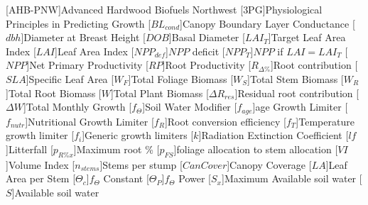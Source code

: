 \usepackage[printonlyused]{acronym}
[AHB-PNW]{Advanced Hardwood Biofuels Northwest}
[\textsc{3PG}]{Physiological Principles in Predicting Growth}
[\ensuremath{BL_{cond}}]{Canopy Boundary Layer Conductance}
[\ensuremath{dbh}]{Diameter at Breast Height}
[\ensuremath{DOB}]{Basal Diameter}
[\ensuremath{LAI_{T}}]{Target Leaf Area Index}
[\ensuremath{LAI}]{Leaf Area Index}
[\ensuremath{NPP_{def}}]{$NPP$ deficit}
[\ensuremath{NPP_{T}}]{$NPP$ if $LAI = LAI_{T}$}
[\ensuremath{NPP}]{Net Primary Productivity}
[\ensuremath{RP}]{Root Productivity}
[\ensuremath{R_{\Delta\%}}]{Root contribution}
[\ensuremath{SLA}]{Specific Leaf Area}
[\ensuremath{W_F}]{Total Foliage Biomass}
[\ensuremath{W_S}]{Total Stem Biomass}
[\ensuremath{W_R}]{Total Root Biomass}
[\ensuremath{W}]{Total Plant Biomass}
[\ensuremath{\Delta R_{res}}]{Residual root contribution}
[\ensuremath{\Delta W}]{Total Monthly Growth}
[\ensuremath{f_\Theta}]{Soil Water Modifier}
[\ensuremath{f_{age}}]{age Growth Limiter}
[\ensuremath{f_{nutr}}]{Nutritional Growth Limiter}
[\ensuremath{f_R}]{Root conversion efficiency}
[\ensuremath{f_T}]{Temperature growth limiter}
[\ensuremath{f_i}]{Generic growth limiters}
[\ensuremath{k}]{Radiation Extinction Coefficient}
[\ensuremath{lf}]{Litterfall}
[\ensuremath{p_{R\%x}}]{Maximum root \%}
[\ensuremath{p_{FS}}]{foliage allocation to stem allocation}
[\ensuremath{VI}]{Volume Index}
[\ensuremath{n_{stems}}]{Stems per stump}
[\ensuremath{CanCover}]{Canopy Coverage}
[\ensuremath{LA}]{Leaf Area per Stem}
[\ensuremath{\Theta_{c}}]{$f_\Theta$ Constant}
[\ensuremath{\Theta_{P}}]{$f_\Theta$ Power}
[\ensuremath{S_x}]{Maximum Available soil water}
[\ensuremath{S}]{Available soil water}